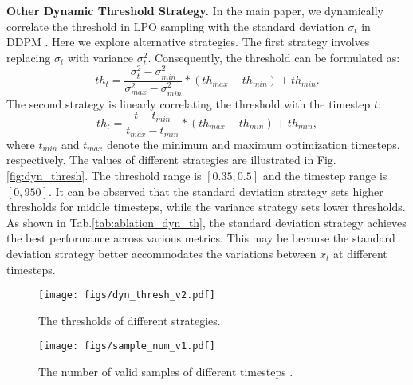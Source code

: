 \textbf{Other Dynamic Threshold Strategy.} In the main paper, we dynamically correlate the threshold in LPO sampling with the standard deviation $\sigma_t$ in DDPM \cite{ddpm}. Here we explore alternative strategies. The first strategy involves replacing $\sigma_t$ with variance $\sigma_t^2$. Consequently, the threshold can be formulated as:
\begin{equation}
    th_t = \frac{\sigma^2_t-\sigma^2_{min}}{\sigma^2_{max}-\sigma^2_{min}}*(th_{max}-th_{min})+th_{min}.
    \label{eq:dyn_thresh_var}
\end{equation}
The second strategy is linearly correlating the threshold with the timestep $t$:
\begin{equation}
    th_t = \frac{t-t_{min}}{t_{max}-t_{min}}*(th_{max}-th_{min})+th_{min},
    \label{eq:dyn_thresh_linear}
\end{equation}
where $t_{min}$ and $t_{max}$ denote the minimum and maximum optimization timesteps, respectively. The values of different strategies are illustrated in Fig.\;\ref{fig:dyn_thresh}. The threshold range is $[0.35, 0.5]$ and the timestep range is $[0, 950]$. It can be observed that the standard deviation strategy sets higher thresholds for middle timesteps, while the variance strategy sets lower thresholds. As shown in Tab.\;\ref{tab:ablation_dyn_th}, the standard deviation strategy achieves the best performance across various metrics. This may be because the standard deviation strategy better accommodates the variations between $x_t$ at different timesteps. 

\begin{figure}[ht]
    \begin{minipage}{0.49\linewidth}
    \centering
    \texttt{[image: figs/dyn\_thresh\_v2.pdf]}
    \vspace{-23pt}
    \caption{The thresholds of different strategies.}
    \label{fig:dyn_thresh}
    \vspace{-5pt}
    \end{minipage}
    \hfill
    \begin{minipage}{0.49\linewidth}
    \centering
    \texttt{[image: figs/sample\_num\_v1.pdf]}
    \vspace{-23pt}
    \caption{The number of valid samples of different timesteps .}
    \label{fig:sample_num}
    \vspace{-5pt}
    \end{minipage}
\end{figure}

